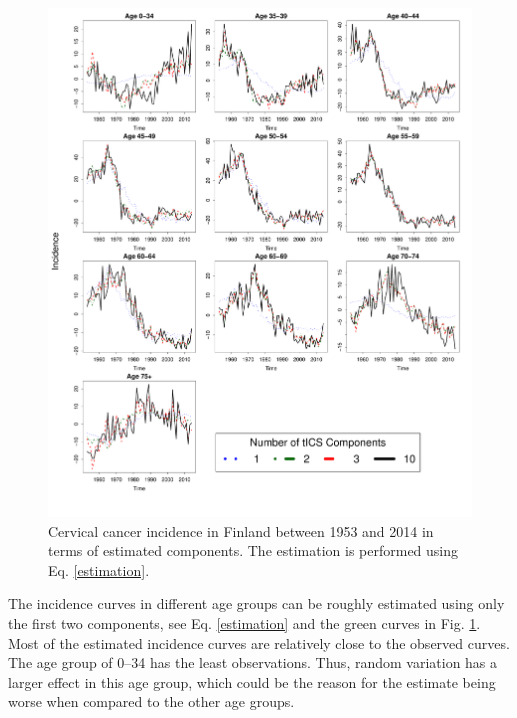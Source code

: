 \documentclass{llncs}
\begin{document}
\begin{figure}
     \centering
 \includegraphics[width=1\linewidth]{dimticsfinal.pdf}
     


     \caption{Cervical cancer incidence in Finland between 1953 and 2014 in terms of estimated components. The estimation is performed using Eq. \ref{estimation}.}
     \label{dimred}
\end{figure}



The incidence curves in different age groups can be roughly estimated using only the first two components, see Eq. \ref{estimation} and  the green curves in Fig. \ref{dimred}. Most of the estimated incidence curves are relatively close to the observed curves. The age group of 0--34 has the least observations. Thus, random variation has a larger effect in this age group, which could be the reason for the estimate being worse when compared to the other age groups.
\end{document}
